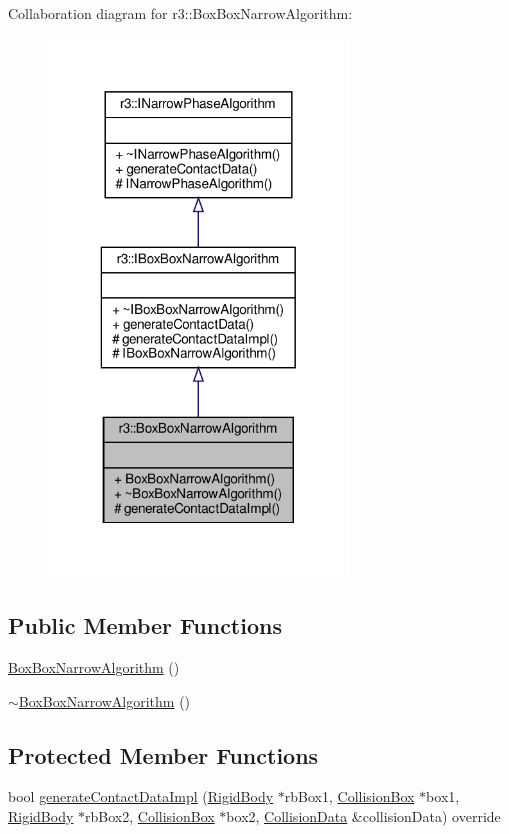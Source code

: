 Collaboration diagram for r3\+:\+:Box\+Box\+Narrow\+Algorithm\+:\nopagebreak
\begin{figure}[H]
\begin{center}
\leavevmode
\includegraphics[width=226pt]{classr3_1_1_box_box_narrow_algorithm__coll__graph}
\end{center}
\end{figure}
\subsection*{Public Member Functions}
\begin{DoxyCompactItemize}
\item 
\mbox{\hyperlink{classr3_1_1_box_box_narrow_algorithm_a3c801622b4235a4738d18fef0eda9949}{Box\+Box\+Narrow\+Algorithm}} ()
\item 
\mbox{\hyperlink{classr3_1_1_box_box_narrow_algorithm_a67eb8bd09d7531a5917ac5e720733075}{$\sim$\+Box\+Box\+Narrow\+Algorithm}} ()
\end{DoxyCompactItemize}
\subsection*{Protected Member Functions}
\begin{DoxyCompactItemize}
\item 
bool \mbox{\hyperlink{classr3_1_1_box_box_narrow_algorithm_a200098ad4e6e2381f58856002a2d5dec}{generate\+Contact\+Data\+Impl}} (\mbox{\hyperlink{classr3_1_1_rigid_body}{Rigid\+Body}} $\ast$rb\+Box1, \mbox{\hyperlink{classr3_1_1_collision_box}{Collision\+Box}} $\ast$box1, \mbox{\hyperlink{classr3_1_1_rigid_body}{Rigid\+Body}} $\ast$rb\+Box2, \mbox{\hyperlink{classr3_1_1_collision_box}{Collision\+Box}} $\ast$box2, \mbox{\hyperlink{classr3_1_1_collision_data}{Collision\+Data}} \&collision\+Data) override
\end{DoxyCompactItemize}



